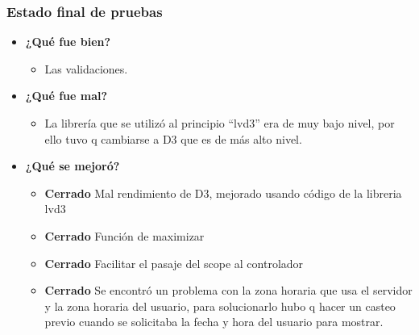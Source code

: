 \subsubsection{Estado final de pruebas}

	\begin{itemize}
		\item \textbf{¿Qué fue bien?}
        	\begin{itemize}
				\item        Las validaciones.
			\end{itemize}
            
		\item \textbf{¿Qué fue mal?}
        	\begin{itemize}
				\item        La librería que se utilizó al principio ``lvd3'' era de muy bajo nivel, por ello tuvo q cambiarse a D3 que es de más alto nivel. 
			\end{itemize}
            
   		\item \textbf{¿Qué se mejoró?}
        	\begin{itemize}
            	\item \textbf{Cerrado} Mal rendimiento de D3, mejorado usando código de la libreria lvd3
            	\item \textbf{Cerrado} Función de maximizar
                \item \textbf{Cerrado} Facilitar el pasaje del scope al controlador
                \item \textbf{Cerrado} Se encontró un problema con la zona horaria que usa el servidor y la zona horaria del usuario, para solucionarlo hubo q hacer un casteo previo cuando se solicitaba la fecha y hora del usuario para mostrar.
			\end{itemize}
       
	\end{itemize}
